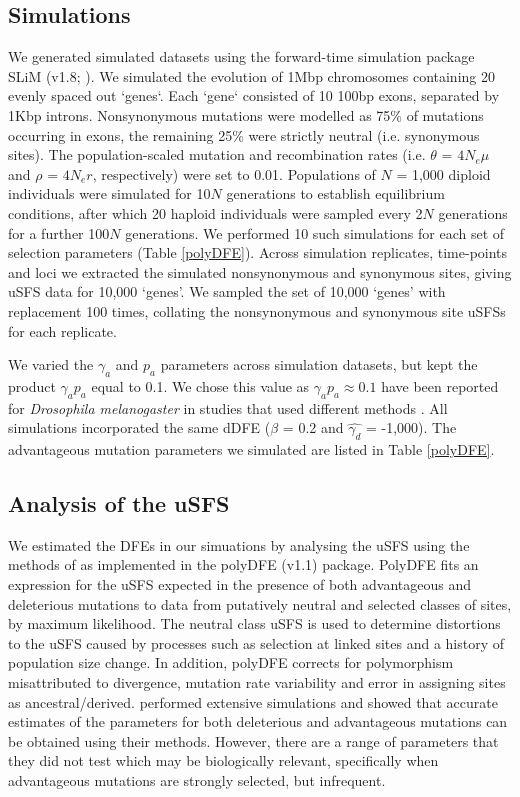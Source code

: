 \documentclass[11pt]{article}
\begin{document}
	\subsection*{Simulations}
	
	We generated simulated datasets using the forward-time simulation package SLiM (v1.8; \citealt{RN148}). We simulated the evolution of 1Mbp chromosomes containing 20 evenly spaced out `genes`. Each `gene` consisted of 10 100bp exons, separated by 1Kbp introns. Nonsynonymous mutations were modelled as 75\% of mutations occurring in exons, the remaining 25\% were strictly neutral (i.e. synonymous sites). The population-scaled mutation and recombination rates (i.e. $\theta$ = \emph{$4N_{e}\mu$} and $\rho$ = \emph{$4N_{e}r$}, respectively) were set to 0.01. Populations of $N$ = 1,000 diploid individuals were simulated for 10$N$ generations to establish equilibrium conditions, after which 20 haploid individuals were sampled every 2$N$ generations for a further 100$N$ generations. We performed 10 such simulations for each set of selection parameters (Table \ref{polyDFE}). Across simulation replicates, time-points and loci we extracted the simulated nonsynonymous and synonymous sites, giving uSFS data for 10,000 `genes'. We sampled the set of 10,000 `genes' with replacement 100 times, collating the nonsynonymous and synonymous site uSFSs for each replicate.

	We varied the $\gamma_a$ and $p_a$ parameters across simulation datasets, but kept the product $\gamma_a p_a$ equal to 0.1. We chose this value as $\gamma_a p_a \approx 0.1$ have been reported for \textit{Drosophila melanogaster} in studies that used different methods \citep{RN323,RN321}. All simulations incorporated the same dDFE ($\beta$ = 0.2 and $\hat{\gamma_d}$ = -1,000). The advantageous mutation parameters we simulated are listed in Table \ref{polyDFE}.


	\subsection*{Analysis of the uSFS}

	
	We estimated the DFEs in our simuations by analysing the uSFS using the methods of \cite{RN354} as implemented in the polyDFE (v1.1) package. PolyDFE fits an expression for the uSFS expected in the presence of both advantageous and deleterious mutations to data from putatively neutral and selected classes of sites, by maximum likelihood. The neutral class uSFS is used to determine distortions to the uSFS caused by processes such as selection at linked sites and a history of population size change. In addition, polyDFE corrects for polymorphism misattributed to divergence, mutation rate variability and error in assigning sites as ancestral/derived. \cite{RN354} performed extensive simulations and showed that accurate estimates of the parameters for both deleterious and advantageous mutations can be obtained using their methods. However, there are a range of parameters that they did not test which may be biologically relevant, specifically when advantageous mutations are strongly selected, but infrequent.
\end{document}
